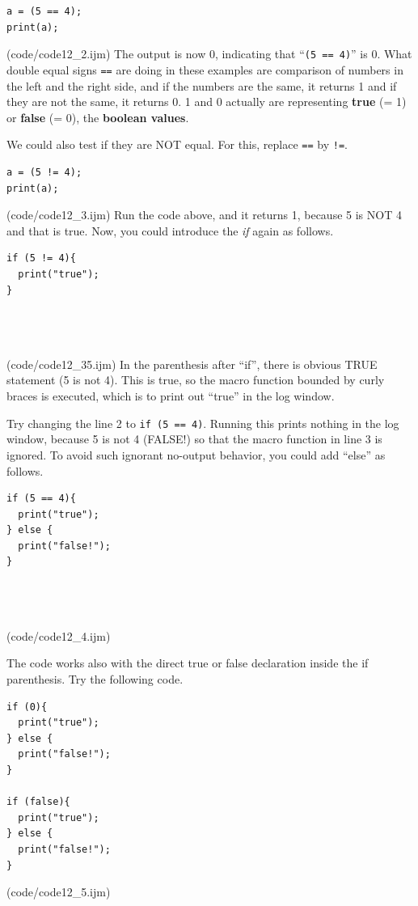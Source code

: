 \documentclass[11pt,a4paper,oneside]{report}
\newcommand{\ilcom}[1]{\texttt{\small#1}}
\begin{document}
\begin{lstlisting}[morekeywords={*, ==}]
a = (5 == 4);
print(a);

\end{lstlisting}
(code/code12_2.ijm)
The output is now 0, indicating that ``\ilcom{(5 == 4)}'' is
0.
What double equal signs \ilcom{==} are doing in these
examples are comparison of numbers in the left and the right side, and if
the numbers are the same, it returns 1 and if they are not the same, it returns 0. 1 and
0 actually are representing \textbf{true} (= 1) or \textbf{false} (= 0), the
\textbf{boolean values}.

We could also test if they are NOT equal. For this, replace \ilcom{==} by
\ilcom{!=}.

\begin{lstlisting}[morekeywords={*, !=}]
a = (5 != 4);
print(a);

\end{lstlisting}
(code/code12_3.ijm)
Run the code above, and it returns 1, because 5 is NOT 4 and that is true. Now,
you could introduce the \textit{if} again as follows.

\begin{lstlisting}[morekeywords={*, if, else}]
if (5 != 4){
  print("true");
} 
  



\end{lstlisting}
(code/code12_35.ijm)
In the parenthesis after ``if'', there is obvious TRUE statement (5 is not 4).
This is true, so the macro function bounded by curly braces is executed, which is to
print out ``true'' in the log window.

Try changing the line 2 to \ilcom{if (5 == 4)}. Running this prints nothing
in the log window, because 5 is not 4 (FALSE!) so that the macro function in
line 3 is ignored. To avoid such ignorant no-output behavior, you could add
``else'' as follows.


\begin{lstlisting}[morekeywords={*, if, else}]
if (5 == 4){
  print("true");
} else {
  print("false!");
}
  



\end{lstlisting}
(code/code12_4.ijm)

The code works also with the direct true or false
declaration inside the if parenthesis. Try the following code.


\begin{lstlisting}[morekeywords={*, if, else}]
if (0){
  print("true");
} else {
  print("false!");
}

if (false){
  print("true");
} else {
  print("false!");
}

\end{lstlisting}
(code/code12_5.ijm)
\end{document}

